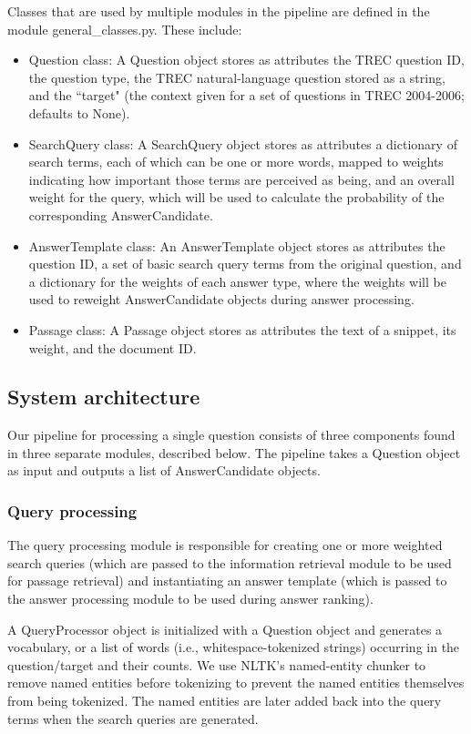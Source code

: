\documentclass[11pt]{article}
\begin{document}
Classes that are used by multiple modules in the pipeline are defined in the module general\_classes.py. These include:

\begin{itemize}
\item Question class: A Question object stores as attributes the TREC question ID, the question type, the TREC natural-language question stored as a string, and the ``target" (the context given for a set of questions in TREC 2004-2006; defaults to None).
\item SearchQuery class: A SearchQuery object stores as attributes a dictionary of search terms, each of which can be one or more words, mapped to weights indicating how important those terms are perceived as being, and an overall weight for the query, which will be used to calculate the probability of the corresponding AnswerCandidate.
\item AnswerTemplate class: An AnswerTemplate object stores as attributes the question ID, a set of basic search query terms from the original question, and a dictionary for the weights of each answer type, where the weights will be used to reweight AnswerCandidate objects during answer processing.
\item Passage class: A Passage object stores as attributes the text of a snippet, its weight, and the document ID.
\end{itemize}

\subsection{System architecture}

Our pipeline for processing a single question consists of three components found in three separate modules, described below. The pipeline takes a Question object as input and outputs a list of AnswerCandidate objects.

\subsubsection{Query processing}

The query processing module is responsible for creating one or more weighted search queries (which are passed to the information retrieval module to be used for passage retrieval) and instantiating an answer template (which is passed to the answer processing module to be used during answer ranking).

A QueryProcessor object is initialized with a Question object and generates a vocabulary, or a list of words (i.e., whitespace-tokenized strings) occurring in the question/target and their counts. We use NLTK's named-entity chunker to remove named entities before tokenizing to prevent the named entities themselves from being tokenized. The named entities are later added back into the query terms when the search queries are generated.
\end{document}
